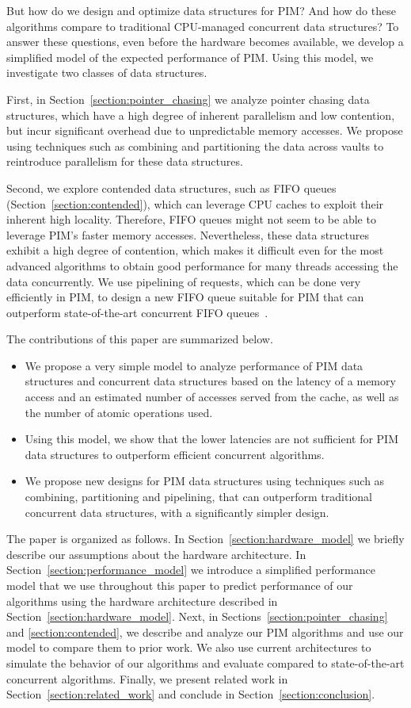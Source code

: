 But how do we design and optimize data structures for PIM? And how do these algorithms compare to traditional CPU-managed concurrent data structures? To answer these questions, even before the hardware becomes available, we develop a simplified model of the expected performance of PIM. Using this model, we 
investigate two classes of data structures. 

First, in Section~\ref{section:pointer_chasing} we analyze pointer chasing data 
structures, which have a high degree of inherent parallelism and low contention, but incur significant 
overhead due to unpredictable memory accesses. 
We propose using techniques such as combining and partitioning 
the data across vaults to reintroduce parallelism for these data structures.

Second, we explore contended data structures, such as FIFO queues (Section~\ref{section:contended}), 
which can leverage CPU caches to exploit their inherent high locality. 
Therefore, FIFO queues might not seem to be able to leverage PIM's faster memory accesses. 
Nevertheless, these data structures exhibit a high degree of contention, which makes it difficult even for 
the most advanced algorithms to obtain good performance for many threads accessing the data concurrently. 
We use pipelining of requests, which can be done very efficiently in PIM, to design a new FIFO queue 
suitable for PIM that can outperform state-of-the-art concurrent FIFO queues~\cite{Morrison13, Hendler10}.

The contributions of this paper are summarized below.
\begin{itemize}
\item We propose a very simple model to analyze performance of PIM data structures and
concurrent data structures based on the latency of a memory access and an estimated number of 
accesses served from the cache, as well as the number of atomic operations used. 
\item Using this model, we show that the lower latencies are not sufficient for PIM data structures
to outperform efficient concurrent algorithms. 
 \item We propose new designs for PIM 
data structures using 
techniques such as combining, partitioning and pipelining, that can outperform traditional 
concurrent data structures, with a significantly simpler design. 
\end{itemize}


The paper is organized as follows. In Section~\ref{section:hardware_model} we briefly describe 
our assumptions about the hardware architecture. 
In Section~\ref{section:performance_model} we introduce a simplified performance model 
that we use throughout this paper to predict performance of our algorithms using the hardware 
architecture described in Section~\ref{section:hardware_model}. 
Next, in Sections~\ref{section:pointer_chasing} and \ref{section:contended}, 
we describe and analyze our PIM algorithms and use our model to compare them to prior work. 
We also use current architectures to simulate the behavior of our algorithms and 
evaluate compared to state-of-the-art concurrent algorithms. 
Finally, we present related work in Section~\ref{section:related_work} 
and conclude in Section~\ref{section:conclusion}. 

